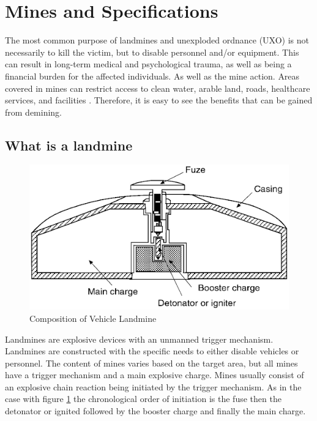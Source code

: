 \section{Mines and Specifications}\label{mas_23}

The most common purpose of landmines and unexploded ordnance (UXO) is not necessarily to kill the victim, but to disable personnel and/or equipment. This can result in long-term medical and psychological trauma, as well as being a financial burden for the affected individuals. As well as the mine action. \cite{LandmineMonitor2019} Areas covered in mines can restrict access to clean water, arable land, roads, healthcare services, and facilities \cite{OxfordAcademic2005}. Therefore, it is easy to see the benefits that can be gained from demining. 

\subsection{What is a landmine}

\begin{figure}
\vspace{-8mm}
\centering
\includegraphics[width=\linewidth]{00 - Images/composition of vehicle landmine.png}
  \caption{Composition of Vehicle Landmine \cite{NAP10071}}
  \label{fig:comp_veh_mine}
\end{figure}

Landmines are explosive devices with an unmanned trigger mechanism. Landmines are constructed with the specific needs to either disable vehicles or personnel. The content of mines varies based on the target area, but all mines have a trigger mechanism and a main explosive charge. Mines usually consist of an explosive chain reaction being initiated by the trigger mechanism. As in the case with figure \ref{fig:comp_veh_mine} the chronological order of initiation is the fuse then the detonator or ignited followed by the booster charge and finally the main charge. \cite{NAP10071}

